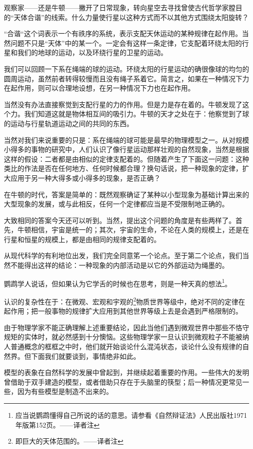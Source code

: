 观察家——还是牛顿——撇开了日常现象，转向星空去寻找曾使古代哲学家膛目的“天体合谐”的线索。什么力量使行星以这种方式而不以其他方式围绕太阳旋转？

“合谐“这个词表示一个有祑序的系统，表示支配天休运动的某种规律在起作用。当然问题不只是“天体”中的某一个。一定会有这样一条定律，它支配着环绕太阳的行星和我们的地球的运动，以及环绕行星的卫星的运动。

我们可以回顾一下系在绳端的球的运动。环绕太阳的行星运动的确很像球的均匀的圆周运动，虽然前者转得较慢而且没有绳子系着它。简言之，如果在一种情况下力在起作用，则可以合理地设想，在另一种情况下力也在起作用。

当然没有办法直接察觉到支配行星的力的作用。但是力是存在着的。牛顿发现了这个力。我们知道这就是物体相互间的吸引力。牛顿的天才之处在于：他察觉到了球的运动与行星轨道运动之间的共同的东西。

当然对我们来说重要的只是：系在绳端的球可能是最早的物理模型之一。从对规模小得多的事物的研究中，人们认识了像行星运动那样壮观的自然现象，当然是根据这样的假设：二者都是由相似的定律支配着的。但随着产生了下面这一问题：这种类比的作法是否在任何地方、任何时候都合理？换句话说，把一种现象的定律，扩大应用于另一种大得多或小得多的现象，是否正确？

在牛顿的时代，答案是简单的：既然观察确证了某种以小型现象为基础计算出来的大型现象的发展，或与此相反，任何一个定律都应当是不受限制地正确的。

大致相同的答案今天还可以听到。当然，提出这个问题的角度是有些两样了。首先，牛顿相信，宇宙是统一的；其次，宇宙的生命，不论在人类的规模上，还是在行星和恒星的规模上，都是由相同的规律支配着的。

从现代科学的有利地位出发，我们完全同意笫一个论点。至于第二个论点，我们当然不能得出这祥的结论：一种现象的内部活动是以它的外部运动为绳墨的。

鹦鹉学人说话，但如果认为它学舌的时候也在思考，则是一种天真的想法\footnote{应当说鹦鹉懂得自己所说的话的意思。请参看《自然辩证法》人民出版社1971年版第152页。——译者注}。

认识的复杂性在于：在微观、宏观和宇观的\footnote{即巨大的天体范围的。——译者注}物质世界等级中，绝对不同的定律在起作用；把一般事物的规律扩大应用到其他世界等级上去是会遇到严格限制的。

由于物理学家不能正确理解上述重要结论，因此当他们遇到微观世界中那些不恪守规矩的实体时，就必然感到十分懊恼。这些物理学家一旦认识到微观粒子不能被纳人普通概念的框框之中时，他们就开始谈论什么混沌状态，谈论什么没有规律的自然界。但下面我们就要谈到，事情绝非如此。

模型的表象在自然科学的发展中曾起到，并继续起着重要的作用。一些伟大的发明曾借助于双手建造的模型，或者借助只存在于头脑里的筷型；后一种情况更常见一些，因为有些模型是制造不出来的。

